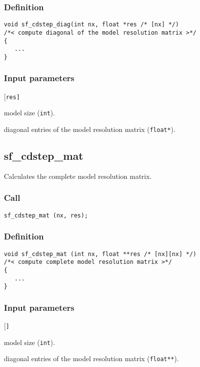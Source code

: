 \subsubsection*{Definition}
\begin{verbatim}
void sf_cdstep_diag(int nx, float *res /* [nx] */)
/*< compute diagonal of the model resolution matrix >*/
{
   ...
}
\end{verbatim}

\subsubsection*{Input parameters}
\begin{desclist}{\tt }{\quad}[\tt res]
   \setlength\itemsep{0pt}
   \item[nx]  model size (\texttt{int}).  
   \item[res] diagonal entries of the model resolution matrix (\texttt{float*}).  
\end{desclist}




\subsection{{sf\_cdstep\_mat}}
Calculates the complete model resolution matrix.

\subsubsection*{Call}
\begin{verbatim}sf_cdstep_mat (nx, res);\end{verbatim}

\subsubsection*{Definition}
\begin{verbatim}
void sf_cdstep_mat (int nx, float **res /* [nx][nx] */)
/*< compute complete model resolution matrix >*/
{
   ...
}
\end{verbatim}

\subsubsection*{Input parameters}
\begin{desclist}{\tt }{\quad}[\tt ]
   \setlength\itemsep{0pt}
   \item[nx]  model size (\texttt{int}).  
   \item[res] diagonal entries of the model resolution matrix (\texttt{float**}).  
\end{desclist}

